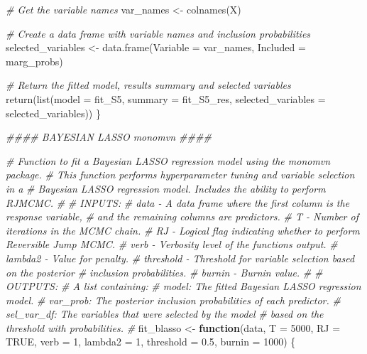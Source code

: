 \documentclass[
  11pt,
]{article}
\newenvironment{Shaded}{}{}
\newcommand{\AttributeTok}[1]{\textcolor[rgb]{0.49,0.56,0.16}{#1}}
\newcommand{\CommentTok}[1]{\textcolor[rgb]{0.38,0.63,0.69}{\textit{#1}}}
\newcommand{\ConstantTok}[1]{\textcolor[rgb]{0.53,0.00,0.00}{#1}}
\newcommand{\ControlFlowTok}[1]{\textcolor[rgb]{0.00,0.44,0.13}{\textbf{#1}}}
\newcommand{\DecValTok}[1]{\textcolor[rgb]{0.25,0.63,0.44}{#1}}
\newcommand{\DocumentationTok}[1]{\textcolor[rgb]{0.73,0.13,0.13}{\textit{#1}}}
\newcommand{\FloatTok}[1]{\textcolor[rgb]{0.25,0.63,0.44}{#1}}
\newcommand{\FunctionTok}[1]{\textcolor[rgb]{0.02,0.16,0.49}{#1}}
\newcommand{\NormalTok}[1]{#1}
\newcommand{\OtherTok}[1]{\textcolor[rgb]{0.00,0.44,0.13}{#1}}
\begin{document}
\begin{Shaded}
\begin{Highlighting}[]
  \CommentTok{\# Get the variable names}
\NormalTok{  var\_names }\OtherTok{\textless{}{-}} \FunctionTok{colnames}\NormalTok{(X)}
  
  \CommentTok{\# Create a data frame with variable names and inclusion probabilities}
\NormalTok{  selected\_variables }\OtherTok{\textless{}{-}} \FunctionTok{data.frame}\NormalTok{(}\AttributeTok{Variable =}\NormalTok{ var\_names, }\AttributeTok{Included =}\NormalTok{ marg\_probs)}
  
  \CommentTok{\# Return the fitted model, results summary and selected variables}
  \FunctionTok{return}\NormalTok{(}\FunctionTok{list}\NormalTok{(}\AttributeTok{model =}\NormalTok{ fit\_S5, }\AttributeTok{summary =}\NormalTok{ fit\_S5\_res, }
              \AttributeTok{selected\_variables =}\NormalTok{ selected\_variables))}
\NormalTok{\}}


\DocumentationTok{\#\#\#\# BAYESIAN LASSO \textquotesingle{}monomvn\textquotesingle{} \#\#\#\#}

\CommentTok{\# Function to fit a Bayesian LASSO regression model using the \textquotesingle{}monomvn\textquotesingle{} package.}
\CommentTok{\#   This function performs hyperparameter tuning and variable selection in a }
\CommentTok{\#   Bayesian LASSO regression model. Includes the ability to perform RJMCMC.}
\CommentTok{\#}
\CommentTok{\# INPUTS:}
\CommentTok{\#   data {-} A data frame where the first column is the response variable, }
\CommentTok{\#          and the remaining columns are predictors.}
\CommentTok{\#   T {-} Number of iterations in the MCMC chain.}
\CommentTok{\#   RJ {-} Logical flag indicating whether to perform Reversible Jump MCMC.}
\CommentTok{\#   verb {-} Verbosity level of the function\textquotesingle{}s output.}
\CommentTok{\#   lambda2 {-} Value for penalty.}
\CommentTok{\#   threshold {-} Threshold for variable selection based on the posterior }
\CommentTok{\#               inclusion probabilities.}
\CommentTok{\#   burnin {-} Burnin value.}
\CommentTok{\#}
\CommentTok{\# OUTPUTS:}
\CommentTok{\#   A list containing:}
\CommentTok{\#     model: The fitted Bayesian LASSO regression model.}
\CommentTok{\#     var\_prob: The posterior inclusion probabilities of each predictor.}
\CommentTok{\#     sel\_var\_df: The variables that were selected by the model}
\CommentTok{\#               based on the threshold with probabilities.}
\CommentTok{\#}
\NormalTok{fit\_blasso }\OtherTok{\textless{}{-}} \ControlFlowTok{function}\NormalTok{(data,  }\AttributeTok{T =} \DecValTok{5000}\NormalTok{, }\AttributeTok{RJ =} \ConstantTok{TRUE}\NormalTok{, }\AttributeTok{verb =} \DecValTok{1}\NormalTok{, }\AttributeTok{lambda2 =} \DecValTok{1}\NormalTok{, }
                       \AttributeTok{threshold =} \FloatTok{0.5}\NormalTok{, }\AttributeTok{burnin =} \DecValTok{1000}\NormalTok{) \{ }
  

\end{Highlighting}
\end{Shaded}
\end{document}
